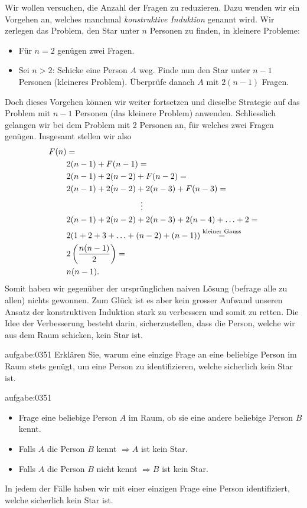 Wir wollen versuchen, die Anzahl der Fragen zu reduzieren. Dazu wenden wir ein Vorgehen an, welches manchmal \textit{konstruktive Induktion} genannt wird. Wir zerlegen das Problem, den Star unter $n$ Personen zu finden, in kleinere Probleme:
\begin{itemize}
    \item Für $n=2$ genügen zwei Fragen.
    \item Sei $n>2$: Schicke eine Person $A$ weg. Finde nun den Star unter $n-1$ Personen (kleineres Problem). Überprüfe danach $A$ mit $2(n-1)$ Fragen.
\end{itemize}
Doch dieses Vorgehen können wir weiter fortsetzen und dieselbe Strategie auf das Problem mit $n-1$ Personen (das kleinere Problem) anwenden. Schliesslich gelangen wir bei dem Problem mit 2 Personen an, für welches zwei Fragen genügen. Insgesamt stellen wir also
\begin{align*}
    F(n) &= \\
    &2(n-1) + F(n-1) =\\
    &2(n-1) + 2(n-2) + F(n-2) =\\
    &2(n-1) + 2(n-2) + 2(n-3) + F(n-3) =\\
    &\quad\quad\quad\quad\quad\quad\quad\quad\quad\vdots \\
    &2(n-1) + 2(n-2) + 2(n-3) + 2(n-4) + \ldots + 2 =\\
    &2(1 + 2 + 3 +\ldots + (n-2) + (n-1)) \stackrel{\text{kleiner Gauss}}{=} \\
    &2\left(\frac{n(n-1)}{2}\right) = \\
    &n(n-1).
\end{align*}
Somit haben wir gegenüber der ursprünglichen naiven Lösung (befrage alle zu allen) nichts gewonnen. Zum Glück ist es aber kein grosser Aufwand unseren Ansatz der konstruktiven Induktion stark zu verbessern und somit zu retten. Die Idee der Verbesserung besteht darin, sicherzustellen, dass die Person, welche wir aus dem Raum schicken, kein Star ist.
\begin{aufgabe}{aufgabe:0351}
Erklären Sie, warum eine einzige Frage an eine beliebige Person im Raum stets genügt, um eine Person zu identifizieren, welche sicherlich kein Star ist.
\end{aufgabe}
\begin{antwort}{aufgabe:0351}
\begin{itemize}
    \item Frage eine beliebige Person $A$ im Raum, ob sie eine andere beliebige Person $B$ kennt.
    \item Falls $A$ die Person $B$ kennt $\Rightarrow A$ ist kein Star.
    \item Falls $A$ die Person $B$ nicht kennt $\Rightarrow B$ ist kein Star.
\end{itemize}
In jedem der Fälle haben wir mit einer einzigen Frage eine Person identifiziert, welche sicherlich kein Star ist.
\end{antwort}
